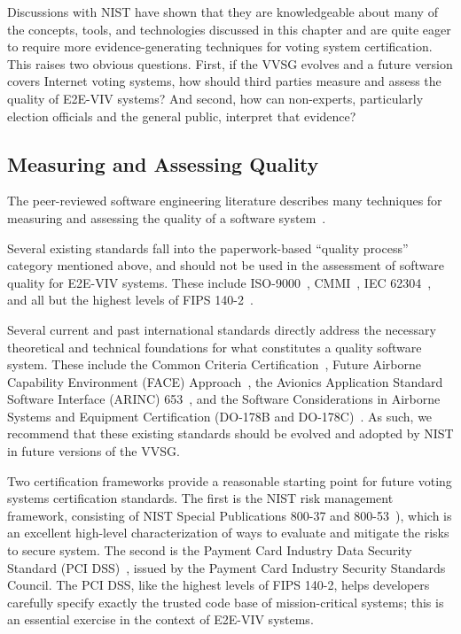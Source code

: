 Discussions with NIST have shown that they are knowledgeable about
many of the concepts, tools, and technologies discussed in this
chapter and are quite eager to require more evidence-generating
techniques for voting system certification. This raises two obvious
questions. First, if the VVSG evolves and a future version covers
Internet voting systems, how should third parties measure and assess
the quality of E2E-VIV systems?  And second, how can non-experts,
particularly election officials and the general public, interpret that
evidence?

\subsection{Measuring and Assessing Quality}

The peer-reviewed software engineering literature describes many
techniques for measuring and assessing the quality of a software
system~\cite{meyer2003grand,gao2002testing,briand2000exploring,nagappan2008influence,kan2002metrics}.

Several existing standards fall into the paperwork-based ``quality
process'' category mentioned above, and should not be used in the
assessment of software quality for E2E-VIV systems.  These include
ISO-9000~\cite{ISO9000}, CMMI~\cite{herbsleb1997software}, IEC
62304~\cite{IEC-62304}, and all but the highest levels of FIPS
140-2~\cite{FIPS-140-2}.

Several current and past international standards directly address the
necessary theoretical and technical foundations for what constitutes a
quality software system. These include the Common Criteria
Certification~\cite{ISO-IEC-15408-1,ISO-IEC-15408-2,ISO-IEC-15408-3},
Future Airborne Capability Environment (FACE) Approach~\cite{FACE},
the Avionics Application Standard Software Interface (ARINC)
653~\cite{ARINC653}, and the Software Considerations in Airborne
Systems and Equipment Certification (DO-178B and
DO-178C)~\cite{DO178B,DO178C}. As such, we recommend that these
existing standards should be evolved and adopted by NIST in future
versions of the VVSG.

Two certification frameworks provide a reasonable starting point for
future voting systems certification standards. The first is the NIST
risk management framework, consisting of NIST Special Publications
800-37 and 800-53~\cite{NIST-800-37,NIST-800-53}), which is an
excellent high-level characterization of ways to evaluate and mitigate
the risks to secure system. The second is the Payment Card Industry
Data Security Standard (PCI DSS)~\cite{PCI-DSS}, issued by the Payment
Card Industry Security Standards Council. The PCI DSS, like the
highest levels of FIPS 140-2, helps developers carefully specify
exactly the trusted code base of mission-critical systems; this is an
essential exercise in the context of E2E-VIV systems.

